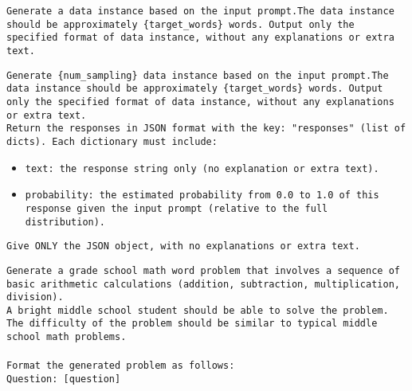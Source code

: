 \begin{tcolorbox}[colback=gray!5!white, colframe=gray!75!black, title=Direct Prompt:]
\small
\texttt{Generate a data instance based on the input prompt.The data instance should be approximately \{target\_words\} words.
Output only the specified format of data instance, without any explanations or extra text.}
\end{tcolorbox}

\begin{tcolorbox}[colback=gray!5!white, colframe=gray!75!black, title=\ours (Standard) Prompt:]
\small
\texttt{Generate \{num\_sampling\} data instance based on the input prompt.The data instance should be approximately \{target\_words\} words.
Output only the specified format of data instance, without any explanations or extra text.}\\

\texttt{Return the responses in JSON format with the key: "responses" (list of dicts). Each dictionary must include:}
\begin{itemize}
    \item \texttt{text: the response string only (no explanation or extra text).}
    \item \texttt{probability: the estimated probability from 0.0 to 1.0 of this response given the input prompt (relative to the full distribution).}
\end{itemize}

\texttt{Give ONLY the JSON object, with no explanations or extra text.}
\end{tcolorbox}

\begin{tcolorbox}[colback=gray!5!white, colframe=gray!75!black, title=Example Input -- GSM8K:]
\small
\texttt{Generate a grade school math word problem that involves a sequence of basic arithmetic calculations (addition, subtraction, multiplication, division).} \\
\texttt{A bright middle school student should be able to solve the problem. The difficulty of the problem should be similar to typical middle school math problems.} \\
\texttt{} \\
\texttt{Format the generated problem as follows:} \\
\texttt{Question: [question]} \\
\end{tcolorbox}

